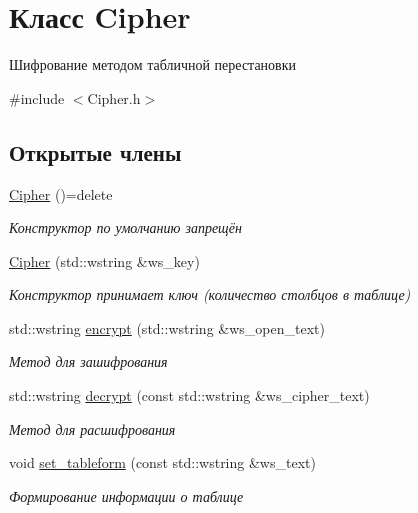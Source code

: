 \hypertarget{classCipher}{}\section{Класс Cipher}
\label{classCipher}


Шифрование методом табличной перестановки  




{\ttfamily \#include $<$Cipher.\+h$>$}

\subsection*{Открытые члены}
\begin{DoxyCompactItemize}
\item 
\mbox{\label{classCipher_ae728d0917db639dd49638a268298391f}} 
\hyperlink{classCipher_ae728d0917db639dd49638a268298391f}{Cipher} ()=delete
\begin{DoxyCompactList}\small\item\em Конструктор по умолчанию запрещён \end{DoxyCompactList}\item 
\hyperlink{classCipher_a876edcc7064f450935baedce442f1556}{Cipher} (std\+::wstring \&ws\+\_\+key)
\begin{DoxyCompactList}\small\item\em Конструктор принимает ключ (количество столбцов в таблице) \end{DoxyCompactList}\item 
std\+::wstring \hyperlink{classCipher_aebf6146bc7bb26d9b934ced49ed6dd19}{encrypt} (std\+::wstring \&ws\+\_\+open\+\_\+text)
\begin{DoxyCompactList}\small\item\em Метод для зашифрования \end{DoxyCompactList}\item 
std\+::wstring \hyperlink{classCipher_accb629416e343719818e557b8eb994dd}{decrypt} (const std\+::wstring \&ws\+\_\+cipher\+\_\+text)
\begin{DoxyCompactList}\small\item\em Метод для расшифрования \end{DoxyCompactList}\item 
void \hyperlink{classCipher_ae40ca9f1c13890b6d734aa9228d0de28}{set\+\_\+tableform} (const std\+::wstring \&ws\+\_\+text)
\begin{DoxyCompactList}\small\item\em Формирование информации о таблице \end{DoxyCompactList}\item 

\end{DoxyCompactItemize}
